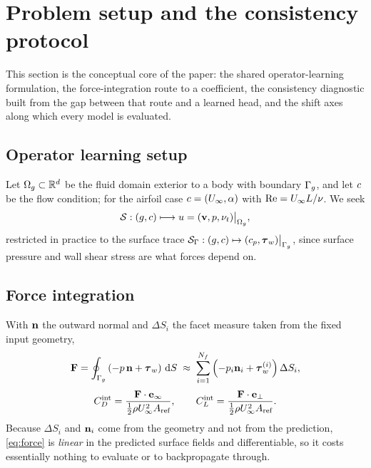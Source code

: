 \section{Problem setup and the consistency protocol}
\label{sec:protocol}

This section is the conceptual core of the paper: the shared operator-learning
formulation, the force-integration route to a coefficient, the consistency
diagnostic built from the gap between that route and a learned head, and the
shift axes along which every model is evaluated.

\subsection{Operator learning setup}
Let $\Omega_{g} \subset \mathbb{R}^d$ be the fluid domain exterior to a body with boundary
$\Gamma_{g}$, and let $c$ be the flow condition; for the airfoil case
$c = (U_{\infty}, \alpha)$ with $\mathrm{Re} = U_{\infty} L / \nu$. We seek
\begin{equation}
  \mathcal{S} : (g, c) \longmapsto u = (\mathbf{v}, p, \nu_t)\big|_{\Omega_{g}},
\end{equation}
restricted in practice to the surface trace
$\mathcal{S}_{\Gamma} : (g,c) \mapsto (c_p, \boldsymbol{\tau}_{w})\big|_{\Gamma_{g}}$, since surface pressure
and wall shear stress are what forces depend on.

\subsection{Force integration}
With $\mathbf{n}$ the outward normal and $\Delta S_i$ the facet measure taken from the
fixed input geometry,
\begin{equation}
  \mathbf{F} = \oint_{\Gamma_{g}} \left( -p\,\mathbf{n} + \boldsymbol{\tau}_{w} \right) \,\mathrm{d}S
      \;\approx\; \sum_{i=1}^{N_f} \left( -p_i \mathbf{n}_i + \boldsymbol{\tau}_{w}^{(i)} \right) \Delta S_i,
  \label{eq:force}
\end{equation}
\begin{equation}
  C_D^{\text{int}} = \frac{\mathbf{F} \cdot \mathbf{e}_{\infty}}{\tfrac12 \rho U_{\infty}^2 A_{\text{ref}}}, \qquad
  C_L^{\text{int}} = \frac{\mathbf{F} \cdot \mathbf{e}_{\perp}}{\tfrac12 \rho U_{\infty}^2 A_{\text{ref}}}.
\end{equation}
Because $\Delta S_i$ and $\mathbf{n}_i$ come from the geometry and not from the
prediction, \eqref{eq:force} is \emph{linear} in the predicted surface fields and
differentiable, so it costs essentially nothing to evaluate or to backpropagate
through.

